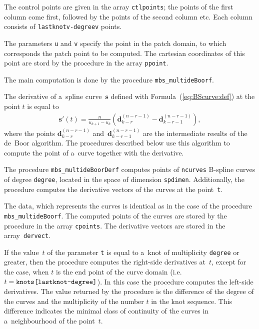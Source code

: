 The control points are given in the array \texttt{ctlpoints}; the points
of the first column come first, followed by the points of the second column etc.
Each column consists of \texttt{lastknotv-degreev} points.

The parameters \texttt{u} and \texttt{v} specify the point in the patch domain,
to which corresponds the patch point to be computed. The cartesian coordinates
of this point are stord by the procedure in the array \texttt{ppoint}.

The main computation is done by the procedure \texttt{mbs\_multideBoorf}.


\vspace{\bigskipamount}
The derivative of a~spline curve~$\bm{s}$ defined with
Formula~(\ref{eq:BScurve:def}) at the point $t$ is equal to
\begin{align}
  \bm{s}'(t) = \frac{n}{u_{k+1}-u_k}(\bm{d}^{(n-r-1)}_{k-r} -
  \bm{d}^{(n-r-1)}_{k-r-1}),
\end{align}
where the points $\bm{d}^{(n-r-1)}_{k-r}$ and~$\bm{d}^{(n-r-1)}_{k-r-1}$
are the intermediate results of the de~Boor algorithm. The procedures
described below use this algorithm to compute the point of a~curve
together with the derivative.

\vspace{\bigskipamount}
\begin{sloppypar}
The procedure \texttt{mbs\_multideBoorDerf} computes points of
\texttt{ncurves} B-spline curves of degree \texttt{degree}, located in the space
of dimension \texttt{spdimen}. Additionally, the procedure computes the
derivative vectors of the curves at the point~\texttt{t}.
\end{sloppypar}

The data, which represents the curves is identical as in the case of
the procedure \texttt{mbs\_multideBoorf}. The computed points of the curves
are stored by the procedure in the array \texttt{cpoints}. The derivative
vectors are stored in the array~\texttt{dervect}.

\begin{sloppypar}
If the value~$t$ of the parameter \texttt{t} is equal to a~knot of multiplicity
\texttt{degree} or greater, then the procedure computes the right-side
derivatives at~$t$, except for the case, when $t$ is the end point of the
curve domain (i.e.\ $t=\mbox{\texttt{knots[lastknot-degree]}}$).
In this case the procedure computes the left-side derivatives.
The value returned by the procedure is the difference of the
degree of the curves and the multiplicity of the number $t$ in the knot sequence.
This difference indicates the minimal class of continuity of the curves
in a~neighbourhood of the point~$t$.
\end{sloppypar}

